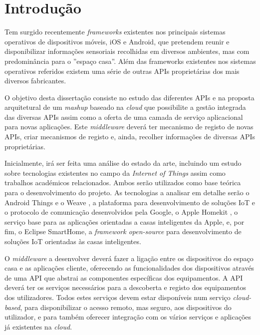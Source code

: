 \setcounter{page}{1}

\chapter{Introdução}
Tem surgido recentemente \textit{frameworks} existentes nos principais sistemas operativos de dispositivos móveis, iOS e Android, que pretendem reunir e disponibilizar informações sensoriais recolhidas em diversos ambientes, mas com predominância para o ''espaço casa''.
Além das frameworks existentes nos sistemas operativos referidos existem uma série de outras APIs proprietárias dos mais diversos fabricantes.

O objetivo desta dissertação consiste no estudo das diferentes APIs e na proposta arquitetural de um \textit{mashup} baseado na \textit{cloud} que possibilite a gestão integrada das diversas APIs assim como a oferta de uma camada de serviço aplicacional para novas aplicações.
Este \textit{middleware} deverá ter mecanismo de registo de novas APIs, criar mecanismos de registo e, ainda, recolher informações de diversas APIs proprietárias.

Inicialmente, irá ser feita uma análise do estado da arte, incluindo  um estudo sobre tecnologias existentes no campo da \textit{Internet of Things} assim como trabalhos académicos relacionados. Ambos serão utilizados como base teórica para o desenvolvimento do projeto. As tecnologias a analisar em detalhe serão o Android Things e o Weave \cite{android-things}, a plataforma para desenvolvimento de soluções IoT e o protocolo de comunicação desenvolvidos pela Google, o Apple Homekit \cite{homekit}, o serviço base para as aplicações orientadas a casas inteligentes da Apple, e, por fim, o Eclipse SmartHome, a \textit{framework open-source} para desenvolvimento de soluções IoT orientadas às casas inteligentes.

O \textit{middleware} a desenvolver deverá fazer a ligação entre os dispositivos do espaço casa e as aplicações cliente, oferecendo as funcionalidades dos dispositivos através de uma API que abstrai as componentes específicas dos equipamentos. A API deverá ter os serviços necessários para a descoberta e registo dos equipamentos dos utilizadores. Todos estes serviços devem estar disponíveis num serviço \textit{cloud-based}, para disponibilizar o acesso remoto, mas seguro, aos dispositivos do utilizador, e para também oferecer integração com os vários serviços e aplicações já existentes na \textit{cloud}.

